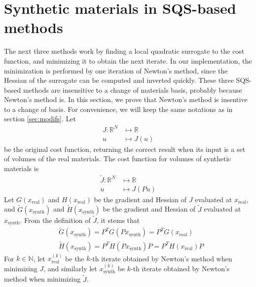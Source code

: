 \documentclass[a4paper, 10pt]{article}
\begin{document}
\section{Synthetic materials in SQS-based methods}
The next three methods work by finding a local quadratic surrogate to the cost function, and minimizing it to obtain the next iterate. In our implementation, 
the minimization is performed by one iteration of Newton's method, since the Hessian of the surrogate can be computed and inverted quickly.
These three SQS-based methods are insensitive to a change of materials basis, probably because Newton's method is. In this section, we prove that
Newton's method is insentive to a change of basis. For convenience, we will keep the same notations as in section \ref{sec:modifs}.
Let 
\begin{equation*}
\begin{split}
J : \mathbb{R}^N &\mapsto \mathbb{R}\\
    u &\mapsto J(u)
 \end{split}
\end{equation*}
be the original cost function, returning the correct result when its input is a set of volumes of the real materials.
The cost function for volumes of synthetic materials is
\begin{equation*}
\begin{split}
\widetilde{J} : \mathbb{R}^N &\mapsto \mathbb{R}\\
  u &\mapsto J(Pu)
 \end{split}
\end{equation*}
Let $G(x_{\text{real}})$ and $H(x_{\text{real}})$ be the gradient and Hessian of $J$ evaluated at $x_{\text{real}}$, 
and $\widetilde{G}(x_{\text{synth}})$ and $\widetilde{H}(x_{\text{synth}})$ be the gradient and Hessian of $\widetilde{J}$ evaluated at $x_{\text{synth}}$.
From the definition of $\widetilde{J}$, it stems that
\begin{equation*}
\begin{split}
 &\widetilde{G}(x_{\text{synth}}) = P^T G(P x_{\text{synth}}) = P^T G(x_{\text{real}}) \\
 &\widetilde{H}(x_{\text{synth}}) = P^T H(P x_{\text{synth}}) P = P^T H(x_{\text{real}}) P
 \end{split}
\end{equation*}
For $k \in \mathbb{N}$, let $x_{\text{real}}^{(k)}$ be the $k$-th iterate obtained by Newton's method when minimizing $J$, 
and similarly let $x_{\text{synth}}^{(k)}$ be $k$-th iterate obtained by Newton's method when minimizing $\widetilde{J}$.
\end{document}
